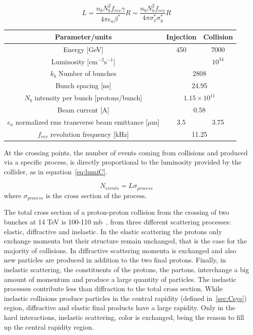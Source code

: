 \begin{equation}
  \label{eq:lumiC}
  L=\frac{n_{b}N_{b}^{2}f_{rev}\gamma}{4\pi\epsilon_{n}\beta^{*}}R=\frac{n_{b}N_{b}^{2}f_{rev}}{4\pi\sigma^{*}_{x}\sigma^{*}_{y}}R
\end{equation}

\begin{table}[htbH]
\label{tab:LHCparams}
\begin{center}
\begin{tabular}{|c|c c|}
\hline 
Parameter/units & Injection & Collision \\
\hline
Energy [GeV]& 450 & 7000 \\ 
Luminosity [$\text{cm}^{-2}\text{s}^{-1}$] & & $10^{34}$ \\
$k_{b}$ Number of bunches & \multicolumn{2}{c|}{2808} \\
Bunch spacing [ns] & \multicolumn{2}{c|}{24.95} \\
$N_{b}$ intensity per bunch [protons/bunch] & \multicolumn{2}{c|}{$1.15\times 10^{11}$} \\
Beam current [A] & \multicolumn{2}{c|}{0.58} \\
$\epsilon_{n}$ normalized rms transverse beam emittance [$\mu$m] & 3.5 & 3.75 \\ 
$f_{rev}$ revolution frequency [kHz] & \multicolumn{2}{c|}{11.25} \\
\hline
\end{tabular}
\end{center}
\end{table}

At the crossing points, the number of events coming from collisions and produced via a specific process, is directly proportional to the luminosity provided by the collider, as in equation~\ref{eq:lumiC}.

\begin{equation}
  \label{eq:lumiN}
  N_{events}=L\sigma_{process}
\end{equation} where $\sigma_{process}$ is the cross section of the process. 

The total cross section of a proton-proton collision from the crossing of two bunches at 14 TeV is 100-110 mb~\cite{Augier:1993ta}, from three different scattering processes: elastic, diffractive and inelastic. In the elastic scattering the protons only exchange momenta but their structure remain unchanged, that is the case for the majority of collisions. In diffractive scattering momenta is exchanged and also new particles are produced in addition to the two final protons. Finally, in inelastic scattering, the constituents of the protons, the partons, interchange a big amount of momentum and produce a large quantity of particles. The inelastic processes contribute less than diffraction to the total cross section. While inelastic collisions produce particles in the central rapidity (defined in~\ref{sec:Csys}) region, diffractive and elastic final products have a large rapidity. Only in the hard interactions, inelastic scattering, color is exchanged, being the reason to fill up the central rapidity region. 

